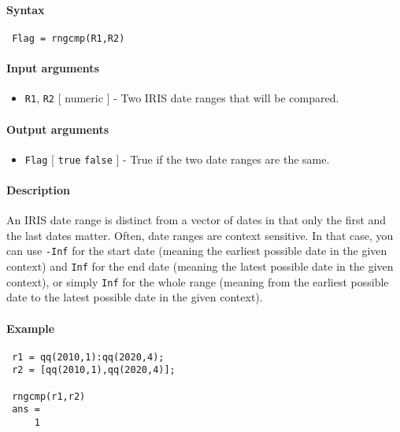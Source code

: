 


	\paragraph{Syntax}
 
 \begin{verbatim}
 Flag = rngcmp(R1,R2)
 \end{verbatim}
 
 \paragraph{Input arguments}
 
 \begin{itemize}
 \item
   \texttt{R1}, \texttt{R2} {[} numeric {]} - Two IRIS date ranges that
   will be compared.
 \end{itemize}
 
 \paragraph{Output arguments}
 
 \begin{itemize}
 \item
   \texttt{Flag} {[} \texttt{true} \textbar{} \texttt{false} {]} - True
   if the two date ranges are the same.
 \end{itemize}
 
 \paragraph{Description}
 
 An IRIS date range is distinct from a vector of dates in that only the
 first and the last dates matter. Often, date ranges are context
 sensitive. In that case, you can use \texttt{-Inf} for the start date
 (meaning the earliest possible date in the given context) and
 \texttt{Inf} for the end date (meaning the latest possible date in the
 given context), or simply \texttt{Inf} for the whole range (meaning from
 the earliest possible date to the latest possible date in the given
 context).
 
 \paragraph{Example}
 
 \begin{verbatim}
 r1 = qq(2010,1):qq(2020,4);
 r2 = [qq(2010,1),qq(2020,4)];
 
 rngcmp(r1,r2)
 ans =
     1
 \end{verbatim}


